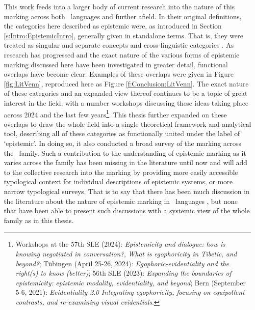 This work feeds into a larger body of current research into the nature of this marking across both \lfam\ languages and further afield. In their original definitions, the categories here described as epistemic were, as introduced in Section \ref{s:Intro:EpistemicIntro}, generally given in standalone terms. That is, they were treated as singular and separate concepts and cross-linguistic categories \cites{ChafeNichols1986}{DeLanceyMirativity1997}{Tournadre1992}{EvansBergqvistSanRoque2018a}. As research has progressed and the exact nature of the various forms of epistemic marking discussed here have been investigated in greater detail, functional overlaps have become clear. Examples of these overlaps were given in Figure \ref{fig:LitVenn}, reproduced here as Figure \ref{f:Conclusion:LitVenn}. The exact nature of these categories and an expanded view thereof continues to be a topic of great interest in the field, with a number workshops discussing these ideas taking place across 2024 and the last few years\footnote{Workshops at the 57th SLE (2024): \textit{Epistemicity and dialogue: how is knowing negotiated in conversation?}, \textit{What is egophoricity in Tibetic, and beyond?}; Tübingen (April 25-26, 2024): \textit{Egophoric-evidentiality and the right(s) to know (better)}; 56th SLE (2023): \textit{Expanding the boundaries of epistemicity: epistemic modality, evidentiality, and beyond}; Bern (September 5-6, 2021): \textit{Evidentiality 2.0 Integrating egophoricity, focusing on equipollent contrasts, and re-examining visual evidentials}.}. This thesis further expanded on these overlaps to draw the whole field into a single theoretical framework and analytical tool, describing all of these categories as functionally united under the label of `epistemic'. In doing so, it also conducted a broad survey of the marking across the \lfam\ family. Such a contribution to the understanding of epistemic marking as it varies across the family has been missing in the literature until now and will add to the collective research into the marking by providing more easily accessible typological context for individual descriptions of epistemic systems, or more narrow typological surveys. That is to say that there has been much discussion in the literature about the nature of epistemic marking in \lfam\ languages \cites{Bergqvist2020a}{DeLancey2012}{Gawne2017}{HengeveldOlbertz2012}{Hill2012}{Hyslop2014}{Hyslop2018}{Widmer2017}{Widmer2020}, but none that have been able to present such discussions with a systemic view of the whole family as in this thesis.

